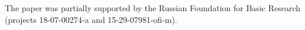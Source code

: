    



\vspace*{-10pt}

 \Ack
\noindent
  The paper was partially supported by the Russian Foundation for Basic Research (projects  
18-07-00274-a and 15-29-07981-ofi-m).



\vspace*{4pt}

  \begin{multicols}{2}

\renewcommand{\bibname}{\protect\rmfamily References}

{\small\frenchspacing
 {%
 \begin{thebibliography}{9}
 
 \vspace*{-4pt}
 

\end{thebibliography}}}
\end{multicols}
